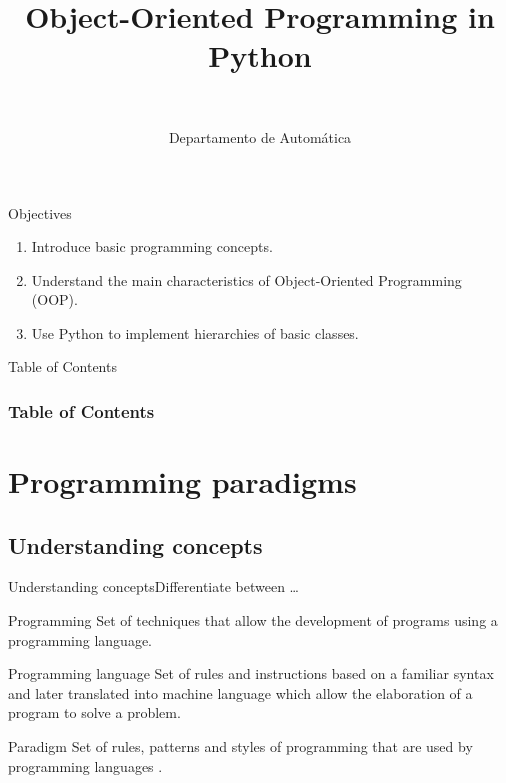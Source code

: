 \documentclass[10pt,compress]{beamer} %
\title[OOP in Python]{Object-Oriented Programming in Python}
\author{\asignatura\\\carrera}
\institute{}
\date{Departamento de Automática}
\begin{document}
{\titlepageBlue
    \begin{frame}
        \titlepage
    \end{frame}
}

\begin{frame}[plain]{}
	\begin{block}{Objectives}
		\begin{enumerate}
		\item Introduce basic programming concepts.
		\item Understand the main characteristics of Object-Oriented Programming (OOP).
		\item Use Python to implement hierarchies of basic classes.
		\end{enumerate}
	\end{block}
\end{frame}

{
\begin{frame}[shrink]{Table of Contents}
 \frametitle{Table of Contents}
 \tableofcontents
\end{frame}
}

\section[Programming paradigms]{Programming paradigms}

\subsection[Understanding concepts]{Understanding concepts}

\begin{frame}{Understanding concepts}{Differentiate between \ldots}
			\begin{block}{Programming}
				Set of techniques that allow the development of programs using a programming language.
			\end{block}
			\begin{block}{Programming language}
				Set of rules and instructions based on a familiar syntax and later translated into machine language which allow the elaboration of a program to solve a problem.			\end{block}
			\begin{block}{Paradigm}
Set of rules, patterns and styles of programming that are used by programming languages \cite{Dpto-CCIA-U.A}.
			\end{block}
\end{frame}
\end{document}

